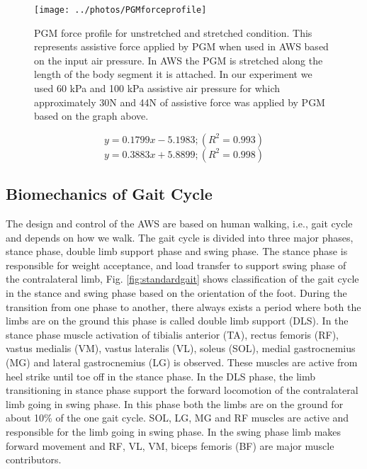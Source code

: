 \documentclass[letterpaper, 10 pt, conference]{ieeeconf}  %
\begin{document}
\begin{figure}
	\centering
	\texttt{[image: ../photos/PGMforceprofile]}
	\caption{PGM force profile for unstretched and stretched condition. This represents assistive force applied by PGM when used in AWS based on the input air pressure. In AWS the PGM is stretched along the length of the body segment it is attached. In our experiment we used 60 kPa and 100 kPa assistive air pressure for which approximately 30N and 44N of assistive force was applied by PGM based on the graph above.}
	\label{fig:pgmforceprofile}
\end{figure}


\begin{equation}\label{pgmunstreched}
y=0.1799x - 5.1983; (R^2=0.993)
\end{equation}
\begin{equation}\label{pgmstreched}
y = 0.3883x + 5.8899; (R^2=0.998)
\end{equation}

\subsection{Biomechanics of Gait Cycle } \label{method:gaitcycle}
The design and control of the AWS are based on human walking, i.e., gait cycle and depends on how we walk. The gait cycle is divided into three major phases, stance phase, double limb support phase and swing phase. The stance phase is responsible for weight acceptance, and load transfer to support swing phase of the contralateral limb, Fig. \ref{fig:standardgait} shows classification of the gait cycle in the stance and swing phase based on the orientation of the foot. During the transition from one phase to another, there always exists a period where both the limbs are on the ground this phase is called double limb support (DLS). In the stance phase muscle activation of tibialis anterior (TA), rectus femoris (RF), vastus medialis (VM), vastus lateralis (VL), soleus (SOL), medial gastrocnemius (MG) and lateral gastrocnemius (LG) is observed. These muscles are active from heel strike until toe off in the stance phase. In the DLS phase, the limb transitioning in stance phase support the forward locomotion of the contralateral limb going in swing phase. In this phase both the limbs are on the ground for about 10\% of the one gait cycle. SOL, LG, MG and RF muscles are active and responsible for the limb going in swing phase. In the swing phase limb makes forward movement and RF, VL, VM, biceps femoris (BF) are major muscle contributors. 
\end{document}
